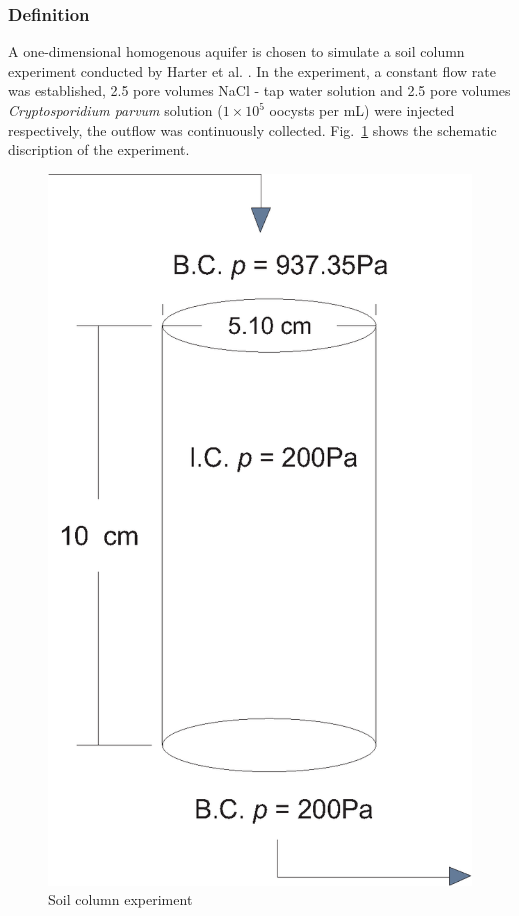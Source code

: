 \subsubsection{Definition}

A one-dimensional homogenous aquifer is chosen to simulate a soil column experiment conducted by Harter et al. \cite{HarWag:00}. In the experiment, a constant flow rate was established, 2.5 pore volumes NaCl - tap water solution and 2.5 pore volumes \emph{Cryptosporidium parvum} solution ($1\times10^5$ oocysts per mL) were injected respectively, the outflow was continuously collected. Fig.~\ref{ExperimentSchematic} shows the schematic discription of the experiment.

\begin{figure}[htbp!]
\centering
\includegraphics[scale=0.35]{PART_II/C/ExperimentSchematic.eps}
\caption{Soil column experiment}
\label{ExperimentSchematic}
\end{figure}

